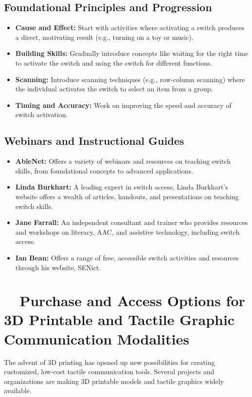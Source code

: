 \subsection{Foundational Principles and Progression}\label{app6:switch-principles}
\begin{itemize}
	\item \textbf{Cause and Effect:} Start with activities where activating a switch produces a direct, motivating result (e.g., turning on a toy or music).
	\item \textbf{Building Skills:} Gradually introduce concepts like waiting for the right time to activate the switch and using the switch for different functions.
	\item \textbf{Scanning:} Introduce scanning techniques (e.g., row-column scanning) where the individual activates the switch to select an item from a group.
	\item \textbf{Timing and Accuracy:} Work on improving the speed and accuracy of switch activation.
\end{itemize}

\subsection{Webinars and Instructional Guides}\label{app6:switch-guides}
\begin{itemize}
	\item \textbf{AbleNet:} Offers a variety of webinars and resources on teaching switch skills, from foundational concepts to advanced applications.
	\item \textbf{Linda Burkhart:} A leading expert in switch access, Linda Burkhart's website offers a wealth of articles, handouts, and presentations on teaching switch skills.
	\item \textbf{Jane Farrall:} An independent consultant and trainer who provides resources and workshops on literacy, AAC, and assistive technology, including switch access.
	\item \textbf{Ian Bean:} Offers a range of free, accessible switch activities and resources through his website, SENict.
\end{itemize}

\section{~~Purchase and Access Options for 3D Printable and Tactile Graphic Communication Modalities}\label{app6:3d-comm}
The advent of 3D printing has opened up new possibilities for creating customized, low-cost tactile communication tools. Several projects and organizations are making 3D printable models and tactile graphics widely available.

